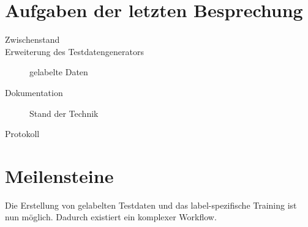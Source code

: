 
\newcommand{\Titel}{7. Protokoll}
\newcommand{\Teilnehmer}{Jonas Bürgel, Markus Reischl, Patrick Welter}
\newcommand{\DatumUndZeit}{07.03.2022 20:00-20:15}
\newcommand{\Ort}{Zoom Meeting}
\newcommand{\Thema}{Erweiterung GAN: Anpassungen zur Qualitätssteigerung}


\section{Aufgaben der letzten Besprechung}
\begin{description}
	\item[Zwischenstand]  \fullcheck
	\item[Erweiterung des Testdatengenerators] gelabelte Daten  \fullcheck
	\item[Dokumentation] Stand der Technik  \fullcheck
	\item[Protokoll]  \fullcheck
\end{description}

\section{Meilensteine}
\begin{description}[style=nextline]
	\item[Komplexer Trainingsworkflow mit gelabelten Daten \hfill \fullcheck]
	Die Erstellung von gelabelten Testdaten und das label-spezifische Training ist nun möglich.
	Dadurch existiert ein komplexer Workflow.
\end{description}

